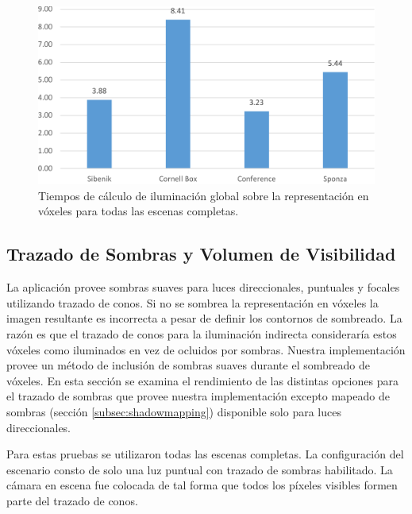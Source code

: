 
\begin{figure}[h]
	\centering
	\includegraphics[width=0.95\linewidth]{media/voxel_gi_time_cropped.pdf}
	\caption{Tiempos de cálculo de iluminación global sobre la representación en vóxeles para todas las escenas completas.}
	\label{fig:gi_voxel_time}
\end{figure}

\subsection{Trazado de Sombras y Volumen de Visibilidad}

La aplicación provee sombras suaves para luces direccionales, puntuales y focales utilizando trazado de conos. Si no se sombrea la representación en vóxeles la imagen resultante es incorrecta a pesar de definir los contornos de sombreado. La razón es que el trazado de conos para la iluminación indirecta consideraría estos vóxeles como iluminados en vez de ocluidos por sombras. Nuestra implementación provee un método de inclusión de sombras suaves durante el sombreado de vóxeles. En esta sección se examina el rendimiento de las distintas opciones para el trazado de sombras que provee nuestra implementación excepto mapeado de sombras (sección \ref{subsec:shadowmapping}) disponible solo para luces direccionales.

Para estas pruebas se utilizaron todas las escenas completas. La configuración del escenario consto de solo una luz puntual con trazado de sombras habilitado. La cámara en escena fue colocada de tal forma que todos los píxeles visibles formen parte del trazado de conos. 

